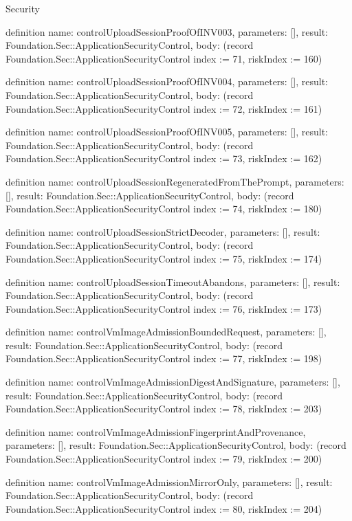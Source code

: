 \begin{lexlean}{Security}
\begin{semanticmodule}
definition{
  name: controlUploadSessionProofOfINV003,
  parameters: [],
  result: Foundation.Sec::ApplicationSecurityControl,
  body: (record Foundation.Sec::ApplicationSecurityControl {index := 71, riskIndex := 160})
}

definition{
  name: controlUploadSessionProofOfINV004,
  parameters: [],
  result: Foundation.Sec::ApplicationSecurityControl,
  body: (record Foundation.Sec::ApplicationSecurityControl {index := 72, riskIndex := 161})
}

definition{
  name: controlUploadSessionProofOfINV005,
  parameters: [],
  result: Foundation.Sec::ApplicationSecurityControl,
  body: (record Foundation.Sec::ApplicationSecurityControl {index := 73, riskIndex := 162})
}

definition{
  name: controlUploadSessionRegeneratedFromThePrompt,
  parameters: [],
  result: Foundation.Sec::ApplicationSecurityControl,
  body: (record Foundation.Sec::ApplicationSecurityControl {index := 74, riskIndex := 180})
}

definition{
  name: controlUploadSessionStrictDecoder,
  parameters: [],
  result: Foundation.Sec::ApplicationSecurityControl,
  body: (record Foundation.Sec::ApplicationSecurityControl {index := 75, riskIndex := 174})
}

definition{
  name: controlUploadSessionTimeoutAbandons,
  parameters: [],
  result: Foundation.Sec::ApplicationSecurityControl,
  body: (record Foundation.Sec::ApplicationSecurityControl {index := 76, riskIndex := 173})
}

definition{
  name: controlVmImageAdmissionBoundedRequest,
  parameters: [],
  result: Foundation.Sec::ApplicationSecurityControl,
  body: (record Foundation.Sec::ApplicationSecurityControl {index := 77, riskIndex := 198})
}

definition{
  name: controlVmImageAdmissionDigestAndSignature,
  parameters: [],
  result: Foundation.Sec::ApplicationSecurityControl,
  body: (record Foundation.Sec::ApplicationSecurityControl {index := 78, riskIndex := 203})
}

definition{
  name: controlVmImageAdmissionFingerprintAndProvenance,
  parameters: [],
  result: Foundation.Sec::ApplicationSecurityControl,
  body: (record Foundation.Sec::ApplicationSecurityControl {index := 79, riskIndex := 200})
}

definition{
  name: controlVmImageAdmissionMirrorOnly,
  parameters: [],
  result: Foundation.Sec::ApplicationSecurityControl,
  body: (record Foundation.Sec::ApplicationSecurityControl {index := 80, riskIndex := 204})
}


\end{semanticmodule}
\end{lexlean}
